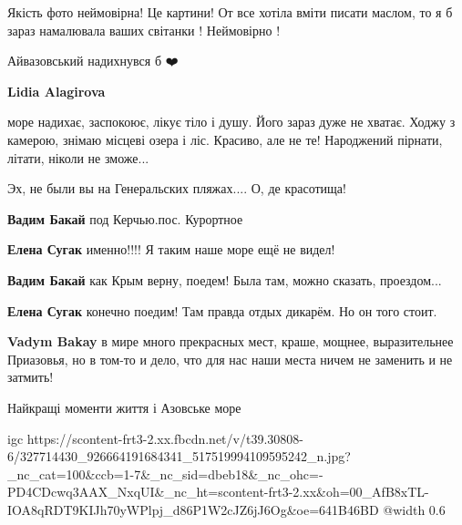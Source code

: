  
 
 
 
 

\qqSecCmt


Якість фото неймовірна! Це картини! От все хотіла вміти писати маслом, то я б
зараз намалювала ваших світанки ! Неймовірно !


Айвазовський надихнувся б ❤️🌊

\begin{itemize} %
\textbf{Lidia Alagirova} 

море надихає, заспокоює, лікує тіло і душу. Його зараз дуже не хватає. Ходжу з
камерою, знімаю місцеві озера і ліс. Красиво, але не те! Народжений пірнати,
літати, ніколи не зможе...
\end{itemize} %


Эх, не были вы на Генеральских пляжах.... О, де красотища!

\begin{itemize} %
\textbf{Вадим Бакай} под Керчью.пос. Курортное

\textbf{Елена Сугак} именно!!!! Я таким наше море ещё не видел!

\textbf{Вадим Бакай} как Крым верну, поедем! Была там, можно сказать, проездом...

\textbf{Елена Сугак} конечно поедим! Там правда отдых дикарём. Но он того стоит.

\textbf{Vadym Bakay} в мире много прекрасных мест, краше, мощнее, выразительнее Приазовья, но в том-то и дело, что для нас наши места ничем не заменить и не затмить!
\end{itemize} %


Найкращі моменти життя і Азовське море 🥰

\ifcmt
  igc https://scontent-frt3-2.xx.fbcdn.net/v/t39.30808-6/327714430_926664191684341_517519994109595242_n.jpg?_nc_cat=100&ccb=1-7&_nc_sid=dbeb18&_nc_ohc=-PD4CDcwq3AAX_NxqUI&_nc_ht=scontent-frt3-2.xx&oh=00_AfB8xTL-IOA8qRDT9KIJh70yWPlpj_d86P1W2cJZ6jJ6Og&oe=641B46BD
	@width 0.6
\fi

